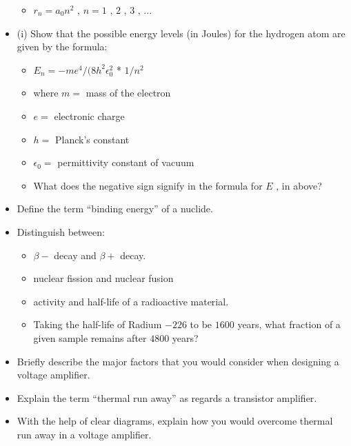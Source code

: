 \documentclass{article}
\begin{document}
\begin{itemize}
 \begin{itemize}
\item $ r_{n}=a_{0}n^{2}$ , $ n=1$ , $ 2$ , $ 3$ , ...
\end{itemize}
\item (i) Show that the possible energy levels (in Joules) for the hydrogen atom are given by the formula:
 \begin{itemize}
\item $ E_{n}=-me^{4}/(8h^{2}\epsilon _{0}^{2}$ * $ 1/n^{2}$
\item where $ m=$ mass of the electron
\item $ e=$ electronic charge
\item $ h=$ Planck's constant
\item $ \epsilon _{0}=$ permittivity constant of vacuum
\item What does the negative sign signify in the formula for $ E$ , in above?
\end{itemize}
\item Define the term “binding energy” of a nuclide.
\item Distinguish between:
 \begin{itemize}
\item $ \beta -$ decay and $ \beta +$ decay.
\item nuclear fission and nuclear fusion
\item activity and half-life of a radioactive material.
\item Taking the half-life of Radium $ -226$ to be $ 1600$ years, what fraction of a given sample remains after $ 4800$ years?
\end{itemize}
\item Briefly describe the major factors that you would consider when designing a voltage amplifier.
\item Explain the term “thermal run away” as regards a transistor amplifier.
\item With the help of clear diagrams, explain how you would overcome thermal run away in a voltage amplifier.
\end{itemize}
\end{document}
